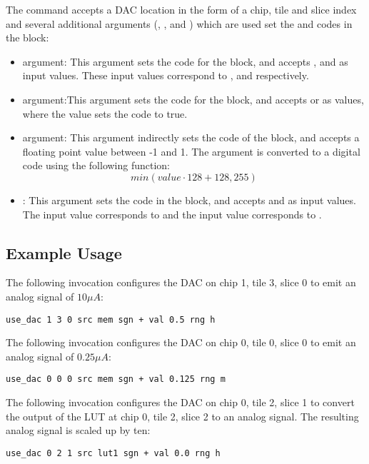 The  command accepts a DAC location in the form of a chip, tile and slice
index and several additional arguments (, ,
 and ) which are used set the \static and \dynamic codes in the block:
\begin{itemize}
\item{} argument: This argument sets the  \static code for
  the block, and accepts ,  and  as input values.
  These input values correspond to ,  and  respectively.

\item{} argument:This argument sets the  \static code for the
  block, and accepts \tx{+} or \tx{-} as values, where the \tx{-} value sets the
   code to true.

\item{} argument: This argument indirectly sets the 
  \dynamic code of the block, and accepts a floating point value between -1 and
  1. The  argument is converted to a digital code using the following function:
\[
  min(value \cdot 128 + 128,255)
\]
\item{}: This argument sets the  \static code in the block,
and accepts  and  as input values. The  input value
corresponds to  and the  input value corresponds to
.

\end{itemize}

\subsection{Example Usage}

The following invocation configures the DAC on chip 1, tile 3, slice 0 to emit
an analog signal of $10 \mu A$:

\begin{lstlisting}
use_dac 1 3 0 src mem sgn + val 0.5 rng h
\end{lstlisting}


The following invocation configures the DAC on chip 0, tile 0, slice 0 to emit
an analog signal of $0.25 \mu A$:

\begin{lstlisting}
use_dac 0 0 0 src mem sgn + val 0.125 rng m
\end{lstlisting}



The following invocation configures the DAC on chip 0, tile 2, slice 1 to
convert the output of the LUT at chip 0, tile 2, slice 2 to an analog signal.
The resulting analog signal is scaled up by ten:

\begin{lstlisting}
use_dac 0 2 1 src lut1 sgn + val 0.0 rng h
\end{lstlisting}